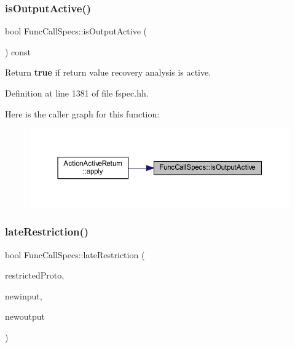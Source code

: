 \subsubsection{\texorpdfstring{isOutputActive()}{isOutputActive()}}
{\footnotesize\ttfamily bool Func\+Call\+Specs\+::is\+Output\+Active (\begin{DoxyParamCaption}\item[{void}]{ }\end{DoxyParamCaption}) const\hspace{0.3cm}{\ttfamily [inline]}}



Return {\bfseries{true}} if return value recovery analysis is active. 



Definition at line 1381 of file fspec.\+hh.

Here is the caller graph for this function\+:
\nopagebreak
\begin{figure}[H]
\begin{center}
\leavevmode
\includegraphics[width=350pt]{class_func_call_specs_a81e8386ebb901a273ef40d8e8430fb57_icgraph}
\end{center}
\end{figure}
\mbox{\label{class_func_call_specs_ab55b52b70e4def9167d06709746635e9}} 
\subsubsection{\texorpdfstring{lateRestriction()}{lateRestriction()}}
{\footnotesize\ttfamily bool Func\+Call\+Specs\+::late\+Restriction (\begin{DoxyParamCaption}\item[{const \mbox{\hyperlink{class_func_proto}{Func\+Proto}} \&}]{restricted\+Proto,  }\item[{vector$<$ \mbox{\hyperlink{class_varnode}{Varnode}} $\ast$ $>$ \&}]{newinput,  }\item[{\mbox{\hyperlink{class_varnode}{Varnode}} $\ast$\&}]{newoutput }\end{DoxyParamCaption})}



